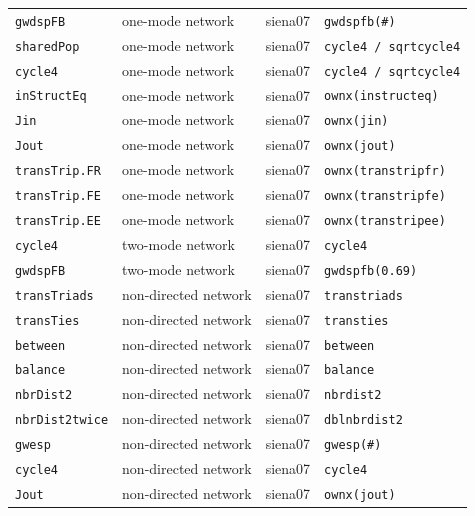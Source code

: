 \begin{longtable}{@{}p{2.6cm}p{3.2cm}p{2.9cm}p{5.4cm}@{}}
\texttt{gwdspFB} & one-mode network & siena07 & \texttt{gwdspfb(\#)}\\
\texttt{sharedPop} & one-mode network & siena07 & \texttt{cycle4 / sqrtcycle4}\\
\texttt{cycle4} & one-mode network & siena07 & \texttt{cycle4 / sqrtcycle4}\\
\texttt{inStructEq} & one-mode network & siena07 & \texttt{ownx(instructeq)}\\
\texttt{Jin} & one-mode network & siena07 & \texttt{ownx(jin)}\\
\texttt{Jout} & one-mode network & siena07 & \texttt{ownx(jout)}\\
\texttt{transTrip.FR} & one-mode network & siena07 & \texttt{ownx(transtripfr)}\\
\texttt{transTrip.FE} & one-mode network & siena07 & \texttt{ownx(transtripfe)}\\
\texttt{transTrip.EE} & one-mode network & siena07 & \texttt{ownx(transtripee)}\\
\texttt{cycle4} & two-mode network & siena07 & \texttt{cycle4}\\
\texttt{gwdspFB} & two-mode network & siena07 & \texttt{gwdspfb(0.69)}\\
\texttt{transTriads} & non-directed network & siena07 & \texttt{transtriads}\\
\texttt{transTies} & non-directed network & siena07 & \texttt{transties}\\
\texttt{between} & non-directed network & siena07 & \texttt{between}\\
\texttt{balance} & non-directed network & siena07 & \texttt{balance}\\
\texttt{nbrDist2} & non-directed network & siena07 & \texttt{nbrdist2}\\
\texttt{nbrDist2twice} & non-directed network & siena07 & \texttt{dblnbrdist2}\\
\texttt{gwesp} & non-directed network & siena07 & \texttt{gwesp(\#)}\\
\texttt{cycle4} & non-directed network & siena07 & \texttt{cycle4}\\
\texttt{Jout} & non-directed network & siena07 & \texttt{ownx(jout)}\\
\bottomrule
\end{longtable}
\normalsize

